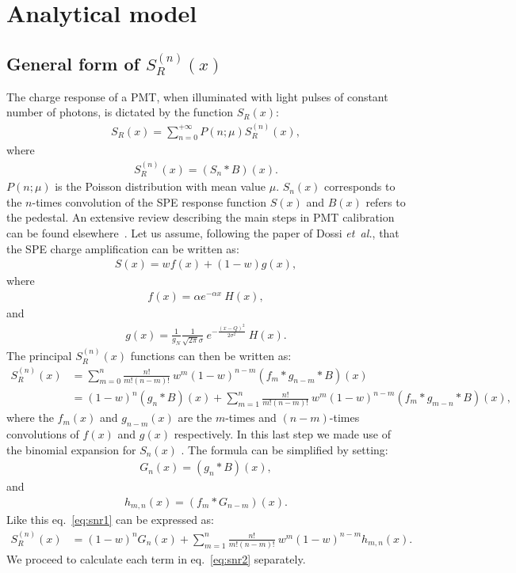 \documentclass[a4paper,11pt]{article}
\begin{document}
\section{Analytical model}
\label{sec:mod}
%

\subsection{General form of $S^{(n)}_R(x)$ }
%

The charge response of a PMT, when illuminated with light pulses of constant number of photons, is dictated by the function $S_R(x)$:
\begin{align}
S_R(x) = \sum_{n=0}^{+\infty} P(n;\mu) S^{(n)}_R(x),
\end{align}
where 
\begin{align}
S^{(n)}_R(x) = (S_n*B)(x). 
\end{align}
$ P(n;\mu)$ is the Poisson distribution with mean value $\mu$. 
$S_n(x)$ corresponds to the $n$-times convolution of the SPE response function $S(x)$ and $B(x)$ refers to the pedestal. 
An extensive review describing the main steps in PMT calibration can be found elsewhere~\cite{me2}. 
Let us assume, following the paper of Dossi \emph{et~al.}, that the SPE charge amplification can be written as:
\begin{align}
S(x) = w f(x) + (1-w)g(x),
\end{align}
where 
\begin{align}
f(x) = \alpha e^{-\alpha x } \ H(x),
\end{align}
and
\begin{align}
g(x) = \frac{1}{g_N} \frac{1}{\sqrt{2\pi}\sigma} \ e^{ - \frac{( x - Q )^2}{2\sigma^2}} \ H(x). 
\end{align}
The principal $S^{(n)}_R(x)$ functions can then be written as:
\begin{align}
S^{(n)}_R(x) & = \sum_{m=0}^{n}  \frac{n!}{m!(n-m)!} \ w^m (1-w)^{n-m} (f_m*g_{n-m} *B )(x)\nonumber \\
                     & = (1-w)^n (g_{n} *B )(x) + \sum_{m=1}^{n}  \frac{n!}{m!(n-m)!} \ w^m (1-w)^{n-m} (f_m*g_{m-n} *B )(x), \label{eq:snr1}
\end{align}
where the $f_m(x)$ and $g_{n-m}(x)$ are the $m$-times and $(n-m)$-times convolutions of $f(x)$ and $g(x)$ respectively. 
In this last step we made use of the binomial expansion for $S_n(x)$ \cite{binom}. 
The formula can be simplified by setting:
\begin{align}
G_n(x) = (g_{n} *B )(x), 
\end{align}
and 
\begin{align}
h_{m,n}(x) = (f_{m} * G_{n-m} )(x).  
\end{align}
Like this eq.~\eqref{eq:snr1} can be expressed as:
\begin{align}
S^{(n)}_R(x) & = (1-w)^n G_n(x) + \sum_{m=1}^{n}  \frac{n!}{m!(n-m)!} \ w^m (1-w)^{n-m} h_{m,n}(x). \label{eq:snr2}
\end{align}
We proceed to calculate each term in eq.~\eqref{eq:snr2} separately.  
\end{document}
